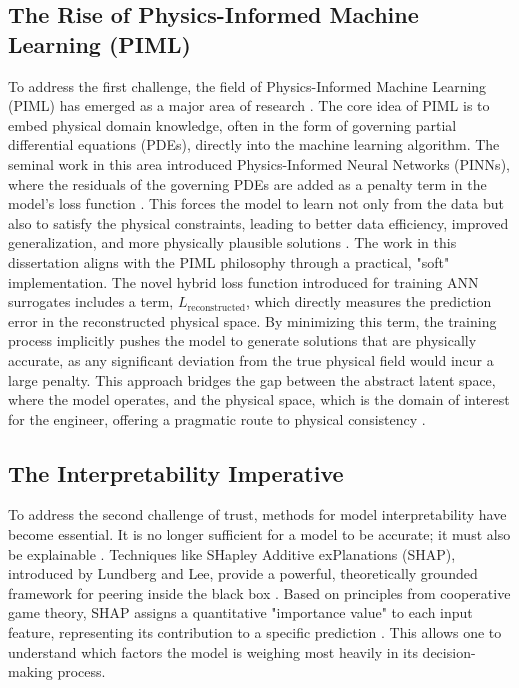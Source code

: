 \documentclass[dsc, EN]{ufabcFHZh}
\begin{document}
\subsection{The Rise of Physics-Informed Machine Learning (PIML)}

To address the first challenge, the field of Physics-Informed Machine Learning (PIML) has emerged as a major area of research \citep{raissi2019physics}. The core idea of PIML is to embed physical domain knowledge, often in the form of governing partial differential equations (PDEs), directly into the machine learning algorithm. The seminal work in this area introduced Physics-Informed Neural Networks (PINNs), where the residuals of the governing PDEs are added as a penalty term in the model's loss function \citep{raissi2019physics, raissi2017part1}. This forces the model to learn not only from the data but also to satisfy the physical constraints, leading to better data efficiency, improved generalization, and more physically plausible solutions \citep{raissi2019physics, raissi2017part1}. The work in this dissertation aligns with the PIML philosophy through a practical, "soft" implementation. The novel hybrid loss function introduced for training ANN surrogates includes a term, $L_{\text{reconstructed}}$, which directly measures the prediction error in the reconstructed physical space. By minimizing this term, the training process implicitly pushes the model to generate solutions that are physically accurate, as any significant deviation from the true physical field would incur a large penalty. This approach bridges the gap between the abstract latent space, where the model operates, and the physical space, which is the domain of interest for the engineer, offering a pragmatic route to physical consistency \citep{chen2023simple}.

\subsection{The Interpretability Imperative}

To address the second challenge of trust, methods for model interpretability have become essential. It is no longer sufficient for a model to be accurate; it must also be explainable \citep{lundberg2017unified, molnar2022interpretable}. Techniques like SHapley Additive exPlanations (SHAP), introduced by Lundberg and Lee, provide a powerful, theoretically grounded framework for peering inside the black box \citep{lundberg2017unified, molnar2022interpretable}. Based on principles from cooperative game theory, SHAP assigns a quantitative "importance value" to each input feature, representing its contribution to a specific prediction \citep{molnar2022interpretable}. This allows one to understand which factors the model is weighing most heavily in its decision-making process.
\end{document}
